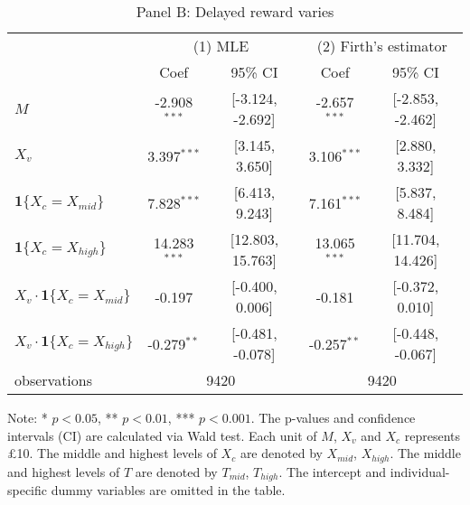 \documentclass[12pt]{article}
\begin{document}
\begin{table}
    \begin{subtable}{\textwidth}
        \centering
        \captionsetup{justification=centering}
        \caption*{Panel B: Delayed reward varies}
\begin{tabular}{lcccc}
  \hline
   & \multicolumn{2}{c}{(1) MLE} & \multicolumn{2}{c}{(2) Firth's estimator} \\ & Coef & 95\% CI & Coef & 95\% CI \\ \hline
$M$ & -2.908$^{***}$ & [-3.124, -2.692] & -2.657$^{***}$ & [-2.853, -2.462] \\ 
  $X_v$ & 3.397$^{***}$ & [3.145, 3.650] & 3.106$^{***}$ & [2.880, 3.332] \\ 
  $\textbf{1}\{X_c = X_{mid}\}$ & 7.828$^{***}$ & [6.413, 9.243] & 7.161$^{***}$ & [5.837, 8.484] \\ 
  $\textbf{1}\{X_c = X_{high}\}$ & 14.283$^{***}$ & [12.803, 15.763] & 13.065$^{***}$ & [11.704, 14.426] \\ 
  $X_v\cdot\textbf{1}\{X_c = X_{mid}\}$ & -0.197 & [-0.400, 0.006] & -0.181 & [-0.372, 0.010] \\ 
  $X_v\cdot\textbf{1}\{X_c = X_{high}\}$ & -0.279$^{**}$ & [-0.481, -0.078] & -0.257$^{**}$ & [-0.448, -0.067] \\ 
   \hline observations & \multicolumn{2}{c}{9420} & \multicolumn{2}{c}{9420} \\ \hline
\end{tabular}

    \end{subtable} 

    \vspace*{4pt}
    \centering
    \begin{minipage}{0.85\textwidth}
    {\par\footnotesize Note: * $p<0.05$, ** $p<0.01$, *** $p<0.001$. The p-values and confidence intervals (CI) are calculated via Wald test. Each unit of $M$, $X_v$ and $X_c$ represents £10. The middle and highest levels of $X_c$ are denoted by $X_{mid}$, $X_{high}$. The middle and highest levels of $T$ are denoted by $T_{mid}$, $T_{high}$. The intercept and individual-specific dummy variables are omitted in the table.}
    \end{minipage}
    \label{tab:baseline}
\end{table}
\end{document}
